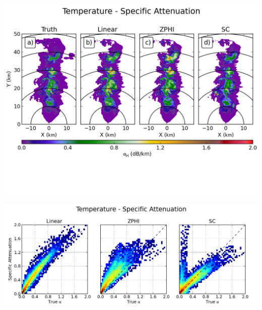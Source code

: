 \documentclass[red]{beamer}
\begin{document}
\begin{frame}
	\begin{center}
		\includegraphics[scale=0.55]{figures/C_Temperature_Specific_Attenuation.png}
	\end{center}
\end{frame}

\begin{frame}
	\begin{center}
		\includegraphics[scale=0.45]{figures/C_Temperature_Specific_Attenuation_scatter.png}
	\end{center}
\end{frame}
\end{document}
